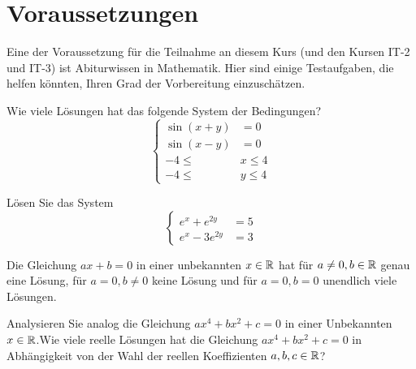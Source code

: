 \section{Voraussetzungen} 

Eine der Voraussetzung für die Teilnahme an diesem Kurs (und den Kursen IT-2 und IT-3) ist Abiturwissen in Mathematik. Hier sind einige Testaufgaben, die helfen könnten, Ihren Grad der Vorbereitung einzuschätzen. 

\begin{aufg}
		Wie viele Lösungen hat das folgende System der Bedingungen?
		\[
			\left\{
				\begin{array}{rl}
						\sin(x+y) & = 0 
						\\ \sin(x-y) & = 0
						\\ -4 \le & x \le 4
						\\ -4 \le & y \le 4
				\end{array} 
				\right.
		\]
\end{aufg} 

\begin{aufg} 
	Lösen Sie das System 
	\[
		\left\{
		\begin{array}{rl}
			e^x + e^{2y} & = 5
			\\ e^x - 3 e^{2y} & = 3
		\end{array} \right. 
	\]
\end{aufg} 

\begin{aufg}
	Die Gleichung $a x + b =0$ in einer unbekannten $x \in \mathbb{R}$ hat für $a \ne 0, b \in \mathbb{R}$ genau eine Lösung, für $a =0, b \ne 0$ keine Lösung und für $a = 0, b= 0$ unendlich viele Lösungen. 
	
	Analysieren Sie analog die Gleichung $a x^4 + b x^2 + c =0$ in einer Unbekannten $x \in \mathbb{R}$.Wie viele reelle Lösungen hat die Gleichung $a x^4 + b x^2 + c =0$ in Abhängigkeit von der Wahl der reellen Koeffizienten $a,b,c \in \mathbb{R}$? 
\end{aufg} 